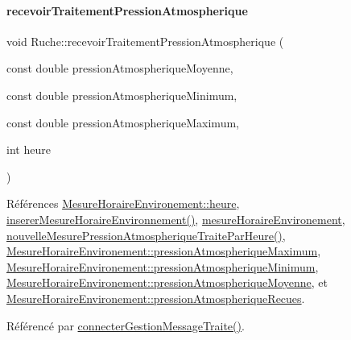 \paragraph{\texorpdfstring{recevoir\+Traitement\+Pression\+Atmospherique}{recevoirTraitementPressionAtmospherique}}
{\footnotesize\ttfamily void Ruche\+::recevoir\+Traitement\+Pression\+Atmospherique (\begin{DoxyParamCaption}\item[{const double}]{pression\+Atmospherique\+Moyenne,  }\item[{const double}]{pression\+Atmospherique\+Minimum,  }\item[{const double}]{pression\+Atmospherique\+Maximum,  }\item[{int}]{heure }\end{DoxyParamCaption})\hspace{0.3cm}{\ttfamily [slot]}}



Références \hyperlink{struct_mesure_horaire_environement_a83295c95940d9edae2d082a94f49e1c9}{Mesure\+Horaire\+Environement\+::heure}, \hyperlink{class_ruche_ac52e79446c5629645e02e27d2a01e56c}{inserer\+Mesure\+Horaire\+Environnement()}, \hyperlink{class_ruche_a73a826506110c10d9221065670985e52}{mesure\+Horaire\+Environement}, \hyperlink{class_ruche_a7948d81996c196eeb0f20dc203a52e75}{nouvelle\+Mesure\+Pression\+Atmospherique\+Traite\+Par\+Heure()}, \hyperlink{struct_mesure_horaire_environement_a9b82da49ea52c6f118f25433a16e22d4}{Mesure\+Horaire\+Environement\+::pression\+Atmospherique\+Maximum}, \hyperlink{struct_mesure_horaire_environement_a3d42b48772717461f7395cdae5ff925f}{Mesure\+Horaire\+Environement\+::pression\+Atmospherique\+Minimum}, \hyperlink{struct_mesure_horaire_environement_a6ae12cb9b6ac6a46f7c08e60049c7b72}{Mesure\+Horaire\+Environement\+::pression\+Atmospherique\+Moyenne}, et \hyperlink{struct_mesure_horaire_environement_a5db5e56af7d297b500912489126f7305}{Mesure\+Horaire\+Environement\+::pression\+Atmospherique\+Recues}.



Référencé par \hyperlink{class_ruche_a20ec8c6dc931218e5cf682050fe845d9}{connecter\+Gestion\+Message\+Traite()}.


